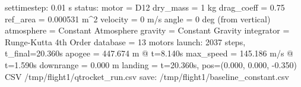 \begin{console}
\ok settimestep: 0.01 s
\ok status:
  motor      = D12
  dry_mass   = 1 kg
  drag_coeff = 0.75
  ref_area   = 0.000531 m^2
  velocity   = 0 m/s
  angle      = 0 deg (from vertical)
  atmosphere = Constant Atmosphere
  gravity    = Constant Gravity
  integrator = Runge-Kutta 4th Order
  database   = 13 motors
\ok launch: 2037 steps, t_final=20.360s
  apogee    = 447.674 m @ t=8.140s
  max_speed = 145.186 m/s @ t=1.590s
  downrange = 0.000 m
  landing   = t=20.360s, pos=(0.000, 0.000, -0.350)
CSV /tmp/flight1/qtrocket_run.csv
\ok save: /tmp/flight1/baseline_constant.csv
\end{console}

